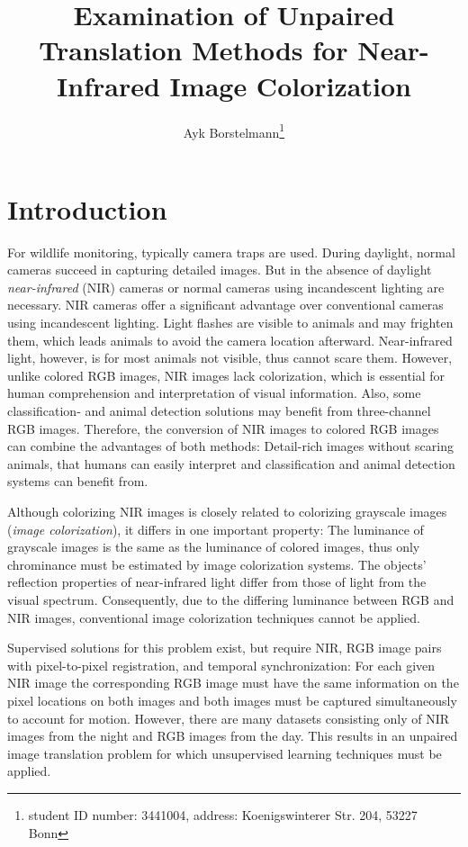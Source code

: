 \documentclass[a4paper,11pt, DIV=12]{scrartcl}
\title{Examination of Unpaired Translation Methods for Near-Infrared Image Colorization}
\author{Ayk Borstelmann\footnote{student ID number: 3441004, address: Koenigswinterer Str. 204, 53227 Bonn}}
\begin{document}
\maketitle

\section{Introduction}
For wildlife monitoring, typically camera traps are used. During daylight, normal cameras succeed in capturing detailed images.
But in the absence of daylight \textit{near-infrared} (NIR) cameras or normal cameras using incandescent lighting are necessary.
NIR cameras offer a significant advantage over conventional cameras using incandescent lighting.
Light flashes are visible to animals and may frighten them, which leads animals to avoid the camera location afterward.
Near-infrared light, however, is for most animals not visible, thus cannot scare them.
However, unlike colored RGB images, NIR images lack colorization, which is essential for human comprehension and interpretation of visual information.
Also, some classification- and animal detection solutions may benefit from three-channel RGB images.
Therefore, the conversion of NIR images to colored RGB images can combine the advantages of both methods:
Detail-rich images without scaring animals, that humans can easily interpret and classification and animal detection systems can benefit from.

Although colorizing NIR images is closely related to colorizing grayscale images (\textit{image colorization}), it differs in one important property:
The luminance of grayscale images is the same as the luminance of colored images, thus only chrominance must be estimated by image colorization systems.
The objects' reflection properties of near-infrared light differ from those of light from the visual spectrum.
Consequently, due to the differing luminance between RGB and NIR images, conventional image colorization techniques cannot be applied.

Supervised solutions for this problem exist, but require NIR, RGB image pairs with pixel-to-pixel registration, and temporal synchronization:
For each given NIR image the corresponding RGB image must have the same information on the pixel locations on both images and both images must be captured simultaneously to account for motion.
However, there are many datasets consisting only of NIR images from the night and RGB images from the day.
This results in an unpaired image translation problem for which unsupervised learning techniques must be applied.
\end{document}
